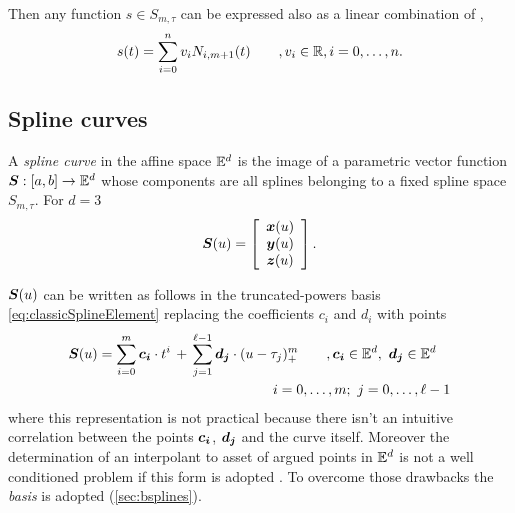 \documentclass[dissertation.tex]{subfiles}
\begin{document}
Then any function $s\in S_{m,\tau}$ can be expressed also as a linear
combination of \bss,
\begin{equation}\label{eq:bsplineElement}
  s(t)=\sum_{i=0}^nv_i N_{i,m+1}(t)\qquad, v_i\in\mathbb{R}, i=0,\dots,n.
\end{equation}

\subsection{Spline curves}
A \emph{spline curve} in the affine space $\mathbb{E}^d$ is the image of a
parametric vector function $\boldsymbol{S}:[a,b]\rightarrow\mathbb{E}^d$ whose
components are all splines belonging to a fixed spline space
$S_{m,\tau}$. For $d=3$
\begin{equation}\label{eq:bsplineCurveComp}
  \boldsymbol{S}(u) = \left[
    \begin{array}{c}
      \boldsymbol{x}(u)\\
      \boldsymbol{y}(u)\\
      \boldsymbol{z}(u)
    \end{array}
    \right].
\end{equation}

$\boldsymbol{S}(u)$ can be written as follows in the
truncated-powers basis
\cref{eq:classicSplineElement} replacing the coefficients $c_i$ and
$d_i$ with points
\begin{equation}\label{eq:classicSplineCurve}
  \begin{multlined}
  \ve{S}(u)=\sum_{i=0}^m \ve{c_i}\cdot t^i\, +\, \sum_{j=1}^{\ell-1}
  \ve{d_j}\cdot (u-\tau_j)_+^m\qquad,\ve{c_i}\in\mE^d,\
  \ve{d_j}\in\mE^d\\
  i=0,\dots,m;\ j=0,\dots,\ell-1
  \end{multlined}
\end{equation}
where this representation is not practical because
there isn't an intuitive correlation between the points
$\boldsymbol{c_i}$, $\boldsymbol{d_j}$ and the curve itself. Moreover the
determination of an interpolant to asset of argued points in $\mathbb{E}^d$
is not a well conditioned problem if this form is adopted
\cite{deboor}. To overcome those drawbacks the \emph{\bss
  basis} is adopted (\cref{sec:bsplines}).
\end{document}
